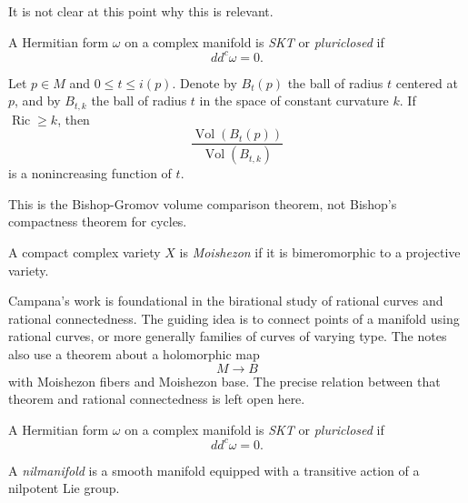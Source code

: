 \begin{remark}
\label{remark-not-clear}
It is not clear at this point why this
is relevant.
\end{remark}

\begin{definition}
\label{definition-hermitian-form2}
A Hermitian form $\omega$ on a complex
manifold is {\it SKT} or {\it
pluriclosed} if
\[
dd^c\omega=0.
\]
\end{definition}

\begin{theorem}
\label{theorem-let-p2}
Let $p\in M$ and $0\leq t\leq i(p)$.
Denote by $B_t(p)$ the ball of radius
$t$ centered at $p$, and by $B_{t,k}$
the ball of radius $t$ in the space of
constant curvature $k$.
If $\operatorname{Ric}\geq k$, then
\[
\frac{\operatorname{Vol}(B_t(p))}
{\operatorname{Vol}(B_{t,k})}
\]
is a nonincreasing function of $t$.
\end{theorem}

\begin{remark}
\label{remark-bishop-gromov}
This is the Bishop-Gromov volume
comparison theorem, not Bishop's
compactness theorem for cycles.
\end{remark}

\begin{definition}
\label{definition-compact-complex}
A compact complex variety $X$ is
{\it Moishezon} if it is bimeromorphic
to a projective variety.
\end{definition}

Campana's work is foundational in the
birational study of rational curves
and rational connectedness.
The guiding idea is to connect points
of a manifold using rational curves,
or more generally families of curves
of varying type.
The notes also use a theorem about a
holomorphic map
\[
M\to B
\]
with Moishezon fibers and Moishezon
base.
The precise relation between that
theorem and rational connectedness is
left open here.

\begin{definition}
\label{definition-hermitian-form2-duplicate-2}
A Hermitian form $\omega$ on a complex
manifold is {\it SKT} or {\it
pluriclosed} if
\[
dd^c\omega=0.
\]
\end{definition}

\begin{definition}
\label{definition-nilmanifold-smooth2-duplicate-2}
A {\it nilmanifold} is a smooth
manifold equipped with a transitive
action of a nilpotent Lie group.
\end{definition}

